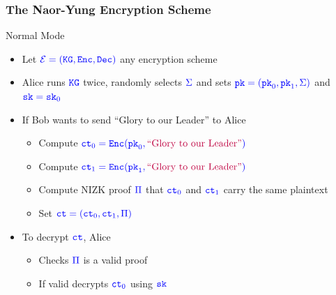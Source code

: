 \documentclass[handout]{beamer}
\begin{document}
\begin{frame}
\frametitle{The Naor-Yung Encryption Scheme}
\begin{exampleblock}{Normal Mode}
\begin{itemize}
\item Let $\color{blue}\mathcal{E}=(\mathtt{KG},\mathtt{Enc},\mathtt{Dec})$ any encryption scheme
\item Alice runs $\color{blue} \mathtt{KG}$ twice, randomly selects $\color{blue} \Sigma$ 
and sets $\color{blue} \mathtt{pk}=(\mathtt{pk}_0,\mathtt{pk}_1,\Sigma)$ and $\color{blue} \mathtt{sk}=\mathtt{sk}_0$
\item If Bob wants to send {\color{purple} ``Glory to our Leader''} to Alice
    \begin{itemize}
    \item Compute $\color{blue} \mathtt{ct}_0=\mathtt{Enc}(\mathtt{pk}_0,\text{\color{purple} ``Glory to our Leader''})$
    \item Compute $\color{blue} \mathtt{ct}_1=\mathtt{Enc}(\mathtt{pk}_1,\text{\color{purple} ``Glory to our Leader''})$
    \item Compute NIZK proof $\color{blue} \Pi$ that $\color{blue} \mathtt{ct}_0$ and $\color{blue} \mathtt{ct}_1$ carry the same    
        plaintext
    \item Set $\color{blue} \mathtt{ct}=(\mathtt{ct}_0,\mathtt{ct}_1,\Pi)$
    \end{itemize}
\item To decrypt $\color{blue} \mathtt{ct}$, Alice
    \begin{itemize}
        \item Checks $\color{blue} \Pi$ is a valid proof
        \item If valid decrypts $\color{blue} \mathtt{ct}_0$ using $\color{blue} \mathtt{sk}$
    \end{itemize}
\end{itemize}
\end{exampleblock}
\end{frame}
\end{document}
